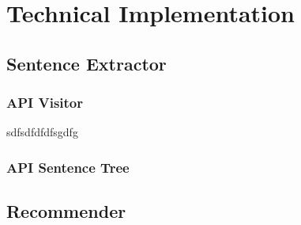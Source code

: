 \section{Technical Implementation}
\subsection{Sentence Extractor}
\subsubsection{API Visitor}
sdfsdfdfdfsgdfg
\subsubsection{API Sentence Tree}

\subsection{Recommender}
